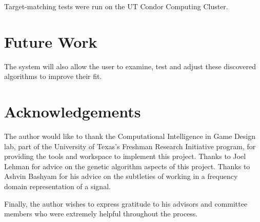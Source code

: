 \documentclass[12pt]{article}
\begin{document}
Target-matching tests were run on the UT Condor Computing Cluster. \begin{comment}Interactive evolution tests were run on a variety of different machines. TODO: fill in with actual data \end{comment}

\section{Future Work}
The system will also allow the user to examine, test and adjust these discovered algorithms to improve their fit.

\section{Acknowledgements}
The author would like to thank the Computational Intelligence in Game Design lab, part of the University of Texas's Freshman Research Initiative program, for providing the tools and workspace to implement this project. Thanks to Joel Lehman for advice on the genetic algorithm aspects of this project. Thanks to Ashvin Bashyam for his advice on the subtleties of working in a frequency domain representation of a signal. 
\begin{comment}
Thanks to TESTERS for kindly agreeing to test the interactive genetic algorithm.
\end{comment}
Finally, the author wishes to express gratitude to his advisors and committee members who were extremely helpful throughout the process.






\end{document}
